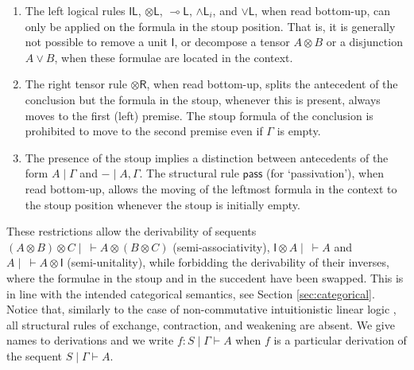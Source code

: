 \documentclass[submission,copyright,creativecommons]{eptcs}
\theoremstyle{definition}
\newcommand{\tl}{\otimes \mathsf{L}}
\newcommand{\tr}{\otimes \mathsf{R}}
\newcommand{\lleft}{{\multimap}\mathsf{L}}
\newcommand{\pass}{\mathsf{pass}}
\newcommand{\unitl}{\mathsf{IL}}
\newcommand{\andli}{\land \mathsf{L}_{i}}
\newcommand{\orl}{\lor \mathsf{L}}
\newcommand{\ot}{\otimes}
\newcommand{\lolli}{\multimap}
\newcommand{\illol}{\rotatebox[origin=c]{180}{$\multimap$}}
\newcommand{\I}{\mathsf{I}}
\newcommand{\NMILL}{$\mathtt{NMILL}$}
\newcommand{\SkNMILL}{$\mathtt{SkNMILL}$}
\begin{document}
\begin{enumerate}
\item The left logical rules $\unitl$, $\tl$, $\lleft$, $\andli$, and $\orl$, when read bottom-up, can only be applied on the formula in the stoup position. 
That is, it is generally not possible to remove a unit $\I$, or decompose a tensor $A \ot B$ or a disjunction $A \lor B$, when these formulae are located in the context.
\item The right tensor rule $\tr$, when read bottom-up, splits the antecedent of the conclusion but the formula in the stoup, whenever this is present, always moves to the first (left) premise.
The stoup formula of the conclusion is prohibited to move to the second premise even if $\Gamma$ is empty. 
\item The presence of the stoup implies a distinction between antecedents of the form $A \mid \Gamma$ and ${-} \mid A, \Gamma$. The structural rule $\pass$ (for `passivation'), when read bottom-up, allows the moving of the leftmost formula in the context to the stoup position whenever the stoup is initially empty.
\end{enumerate}
These restrictions allow the derivability of sequents $(A \ot B) \ot C \mid ~\vdash A \ot (B\ot C)$ (semi-associativity), $\I \ot A \mid ~ \vdash A$ and $A \mid ~ \vdash A \ot \I$ (semi-unitality), while forbidding the derivability of their inverses, where the formulae in the stoup and in the succedent have been swapped. This is in line with the intended categorical semantics, see Section \ref{sec:categorical}.
Notice that, similarly to the case of non-commutative intuitionistic linear logic \cite{abrusci:noncommutative:1990}, all structural rules of exchange, contraction, and weakening are absent. We give names to derivations and we write $f : S \mid \Gamma \vdash A$ when $f$ is a particular derivation of the sequent $S \mid \Gamma \vdash A$.
\end{document}
